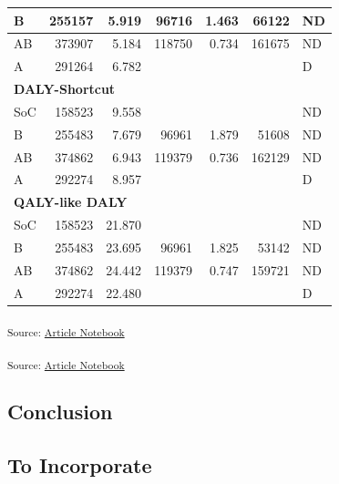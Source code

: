 \documentclass[
]{agujournal2019}
\begin{document}
\begin{table}
\begin{tabular}{l|r|r|r|r|r|l}
\hline
\hspace{1em}B & 255157 & 5.919 & 96716 & 1.463 & 66122 & ND\\
\hline
\hspace{1em}AB & 373907 & 5.184 & 118750 & 0.734 & 161675 & ND\\
\hline
\hspace{1em}A & 291264 & 6.782 &  &  &  & D\\
\hline
\multicolumn{7}{l}{\textbf{DALY-Shortcut}}\\
\hline
\hspace{1em}SoC & 158523 & 9.558 &  &  &  & ND\\
\hline
\hspace{1em}B & 255483 & 7.679 & 96961 & 1.879 & 51608 & ND\\
\hline
\hspace{1em}AB & 374862 & 6.943 & 119379 & 0.736 & 162129 & ND\\
\hline
\hspace{1em}A & 292274 & 8.957 &  &  &  & D\\
\hline
\multicolumn{7}{l}{\textbf{QALY-like DALY}}\\
\hline
\hspace{1em}SoC & 158523 & 21.870 &  &  &  & ND\\
\hline
\hspace{1em}B & 255483 & 23.695 & 96961 & 1.825 & 53142 & ND\\
\hline
\hspace{1em}AB & 374862 & 24.442 & 119379 & 0.747 & 159721 & ND\\
\hline
\hspace{1em}A & 292274 & 22.480 &  &  &  & D\\
\hline
\end{tabular}
\end{table}

\textsubscript{Source:
\href{https://graveja0.github.io/dalys/index.qmd.html}{Article
Notebook}}

\textsubscript{Source:
\href{https://graveja0.github.io/dalys/index.qmd.html}{Article
Notebook}}

\subsection{Conclusion}\label{conclusion}

\subsection{To Incorporate}\label{to-incorporate}
\end{document}
